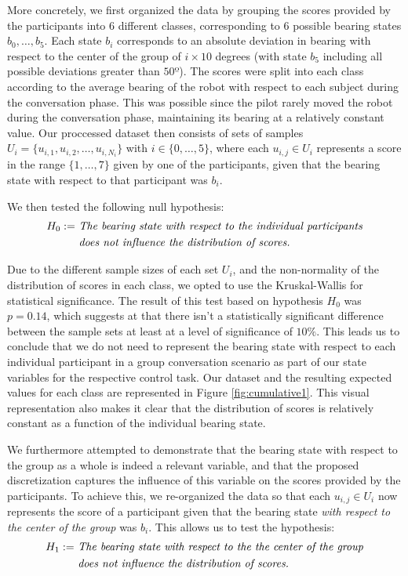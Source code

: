 \documentclass[a4paper,11pt]{report}
\begin{document}
More concretely, we first organized the data by grouping the scores provided by the participants into $6$ different classes, corresponding to $6$ possible bearing states $b_0,\ldots,b_5$. Each state $b_i$ corresponds to an absolute deviation in bearing with respect to the center of the group of $i\times 10$ degrees (with state $b_5$ including all possible deviations greater than $50º$). The scores were split into each class according to the average bearing of the robot with respect to each subject during the conversation phase. This was possible since the pilot rarely moved the robot during the conversation phase, maintaining its bearing at a relatively constant value. Our proccessed dataset then consists of sets of samples $U_i = \{u_{i,1},u_{i,2},\ldots,u_{i,N_i}\}$ with $i\in\{0,\ldots,5\}$, where each $u_{i,j}\in U_i$ represents a score in the range $\{1,\ldots,7\}$ given by one of the participants, given that the bearing state with respect to that participant was $b_i$.

We then tested the following null hypothesis:
\begin{align*}
 H_0 := & \text{ \textit{The bearing state with respect to the individual participants}}\\
        & \text{ \textit{does not influence the distribution of scores.}}
\end{align*}

Due to the different sample sizes of each set $U_i$, and the non-normality of the distribution of scores in each class, we opted to use the Kruskal-Wallis for statistical significance. The result of this test based on hypothesis $H_0$ was $p = 0.14$, which suggests at that there isn't a statistically significant difference between the sample sets at least at a level of significance of $10\%$. This leads us to conclude that we do not need to represent the bearing state with respect to each individual participant in a group conversation scenario as part of our state variables for the respective control task. Our dataset and the resulting expected values for each class are represented in Figure \ref{fig:cumulative1}. This visual representation also makes it clear that the distribution of scores is relatively constant as a function of the individual bearing state.

We furthermore attempted to demonstrate that the bearing state with respect to the group as a whole is indeed a relevant variable, and that the proposed discretization captures the influence of this variable on the scores provided by the participants. To achieve this, we re-organized the data so that each $u_{i,j}\in U_i$ now represents the score of a participant given that the bearing state \emph{with respect to the center of the group} was $b_i$. This allows us to test the hypothesis:
\begin{align*}
 H_1 := & \text{ \textit{The bearing state with respect to the the center of the group}}\\
        & \text{ \textit{does not influence the distribution of scores.}}
\end{align*}
\end{document}
